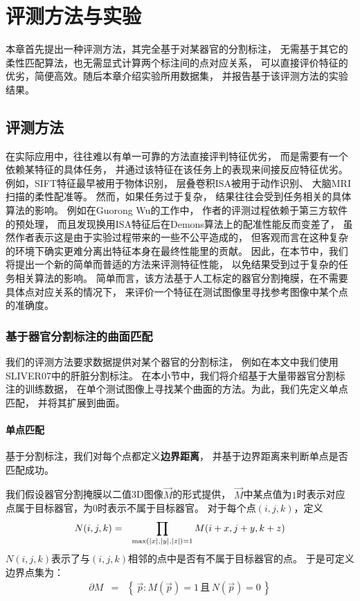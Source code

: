 
\chapter{评测方法与实验\label{chap:expr}}
本章首先提出一种评测方法，其完全基于对某器官的分割标注，
无需基于其它的柔性匹配算法，也无需显式计算两个标注间的点对应关系，
可以直接评价特征的优劣，简便高效。随后本章介绍实验所用数据集，
并报告基于该评测方法的实验结果。

\section{评测方法}
在实际应用中，往往难以有单一可靠的方法直接评判特征优劣，
而是需要有一个依赖某特征的具体任务，
并通过该特征在该任务上的表现来间接反应特征优劣。
例如，SIFT特征最早被用于物体识别\cite{lowe1999object}，
层叠卷积ISA被用于动作识别\cite{le2011learning}、
大脑MRI扫描的柔性配准\cite{wu2013unsupervised}等。
然而，如果任务过于复杂，
结果往往会受到任务相关的具体算法的影响。
例如在Guorong Wu的工作\cite{wu2013unsupervised}中，
作者的评测过程依赖于第三方软件的预处理，
而且发现换用ISA特征后在Demons算法上的配准性能反而变差了，
虽然作者表示这是由于实验过程带来的一些不公平造成的，
但客观而言在这种复杂的环境下确实更难分离出特征本身在最终性能里的贡献。
因此，在本节中，我们将提出一个新的简单而普适的方法来评测特征性能，
以免结果受到过于复杂的任务相关算法的影响。
简单而言，该方法基于人工标定的器官分割掩膜，在不需要具体点对应关系的情况下，
来评价一个特征在测试图像里寻找参考图像中某个点的准确度。

\subsection{基于器官分割标注的曲面匹配}
我们的评测方法要求数据提供对某个器官的分割标注，
例如在本文中我们使用SLIVER07中的肝脏分割标注。
在本小节中，我们将介绍基于大量带器官分割标注的训练数据，
在单个测试图像上寻找某个曲面的方法。为此，我们先定义单点匹配，
并将其扩展到曲面。

\subsubsection{单点匹配}
基于分割标注，我们对每个点都定义{\bf 边界距离}，
并基于边界距离来判断单点是否匹配成功。

我们假设器官分割掩膜以二值3D图像$\vec{M}$的形式提供，
$\vec{M}$中某点值为$1$时表示对应点属于目标器官，为$0$时表示不属于目标器官。
对于每个点$(i, j, k)$，定义
\begin{eqnarray}
    N(i, j, k) &=& \prod_{
        \max(\left|x\right|, \left|y\right|, \left|z\right|) = 1}
        M(i + x, j + y, k + z)
\end{eqnarray}
$N(i, j, k)$表示了与$(i, j, k)$相邻的点中是否有不属于目标器官的点。
于是可定义边界点集为：
\begin{eqnarray}
    \partial M &=& \left\{\,\vec{p} : M(\vec{p}) = 1\,\text{且}\,
        N(\vec{p}) = 0\,\right\}
\end{eqnarray}

